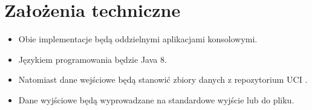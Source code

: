 \section{Założenia techniczne}

\begin{itemize}
  \item Obie implementacje będą oddzielnymi aplikacjami konsolowymi.
  \item Językiem programowania będzie Java 8. 
  \item Natomiast dane wejściowe będą stanowić zbiory danych z repozytorium UCI \cite{UCI}.
  \item Dane wyjściowe będą wyprowadzane na standardowe wyjście lub do pliku.
\end{itemize}
